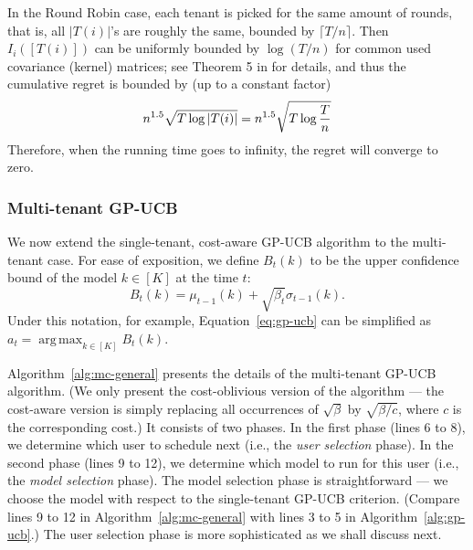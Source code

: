 \documentclass[letterpaper]{vldb}
\DeclareMathOperator*{\argmax}{arg\,max}
\begin{document}
In the Round Robin case, each tenant is picked for the same amount of rounds, that is, all $|T(i)|$'s are roughly the same, bounded by $\lceil T/n\rceil$. Then $I_i([T(i)])$ can be uniformly bounded by $\log (T/n)$ for common used covariance (kernel) matrices; see Theorem 5 in \cite{SrinivasKKS10} for details, and thus the cumulative regret is bounded by (up to a constant factor) 
\begin{equation}
n^{1.5}\sqrt{T \log |T(i)|} = n^{1.5}\sqrt{T \log {T\over n}}
\label{eq:RR_simple_bound}
\end{equation}
Therefore, when the running time goes to infinity, the regret will converge to zero.


\subsubsection{Multi-tenant GP-UCB}

We now extend the single-tenant, cost-aware GP-UCB algorithm to the multi-tenant case.
For ease of exposition, we define $B_t(k)$ to be the upper confidence bound of the model $k\in[K]$ at the time $t$: %
\begin{equation}
B_t(k)=\mu_{t-1}(k) + \sqrt{\beta_t}\sigma_{t-1}(k).
\end{equation}
Under this notation, for example, Equation~\ref{eq:gp-ucb} can be simplified as $a_t=\argmax_{k\in [K]} B_t(k)$.


Algorithm~\ref{alg:mc-general} presents the details of the multi-tenant GP-UCB algorithm.
(We only present the cost-oblivious version of the algorithm --- the cost-aware version is simply replacing all occurrences of $\sqrt{\beta}$ by $\sqrt{\beta/c}$, where $c$ is the corresponding cost.)
It consists of two phases.
In the first phase (lines 6 to 8), we determine which user to schedule next (i.e., the \emph{user selection} phase).
In the second phase (lines 9 to 12), we determine which model to run for this user (i.e., the \emph{model selection} phase).
The model selection phase is straightforward --- we choose the model with respect to the single-tenant GP-UCB criterion. (Compare lines 9 to 12 in Algorithm~\ref{alg:mc-general} with lines 3 to 5 in Algorithm~\ref{alg:gp-ucb}.)
The user selection phase is more sophisticated as we shall discuss next.
\end{document}
